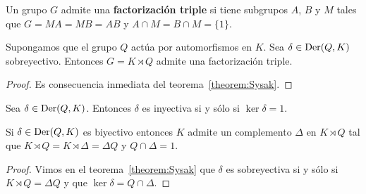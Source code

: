\begin{definition}
	Un grupo $G$ admite una \textbf{factorización triple} si tiene subgrupos
	$A$, $B$ y $M$ tales que $G=MA=MB=AB$ y $A\cap M=B\cap M=\{1\}$.
\end{definition}


\begin{corollary}
	Supongamos que el grupo $Q$ actúa por automorfismos en $K$. Sea
	$\delta\in\operatorname{Der}(Q,K)$ sobreyectivo. Entonces $G=K\rtimes Q$ admite una
	factorización triple.
\end{corollary}

\begin{proof}
	Es consecuencia inmediata del teorema~\ref{theorem:Sysak}. 
\end{proof}

\begin{exercise}
	\label{exercise:ker1cocycle}
	Sea $\delta\in\operatorname{Der}(Q,K)$. Entonces $\delta$ es inyectiva si y sólo si
	$\ker\delta=1$.
\end{exercise}


\begin{corollary}
	Si $\delta\in\operatorname{Der}(Q,K)$ es biyectivo entonces $K$ admite un complemento
	$\Delta$ en $K\rtimes Q$ tal que $K\rtimes Q=K\rtimes\Delta=\Delta Q$ y
	$Q\cap\Delta=1$.
\end{corollary}

\begin{proof}
	Vimos en el teorema~\ref{theorem:Sysak} que $\delta$ es sobreyectiva si y
	sólo si $K\rtimes Q=\Delta Q$ y que $\ker\delta=Q\cap\Delta$.
\end{proof}

